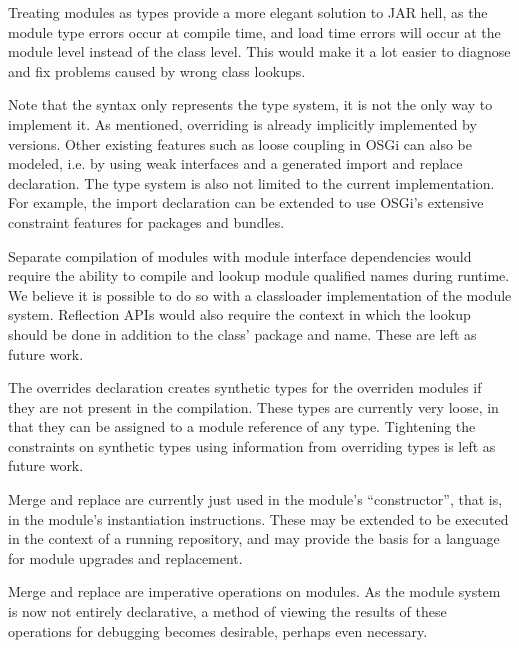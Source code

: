 Treating modules as types provide a more elegant solution to JAR hell, as the module
type errors occur at compile time, and load time errors will occur at the module level
instead of the class level. This would make it a lot easier to diagnose and
fix problems caused by wrong class lookups.

Note that the syntax only represents the type system, it is not the only way
to implement it. As mentioned, overriding is already implicitly implemented
by versions. Other existing features such as loose coupling in OSGi can
also be modeled, i.e. by using weak interfaces and a generated import and replace
declaration. The type system is also not limited to
the current implementation. For example, the import declaration can be 
extended to use OSGi's extensive constraint features for packages and bundles.

Separate compilation of modules with module interface dependencies would require
the ability to compile and lookup module qualified names during runtime. We believe
it is possible to do so with a classloader implementation of the module system. Reflection
APIs would also require the context in which the lookup should be done in addition to
the class' package and name. These are left as future work.

The overrides declaration creates synthetic types for the overriden modules 
if they are not present in the compilation. These types are currently very loose,
in that they can be assigned to a module reference of any type. Tightening the
constraints on synthetic types using information from overriding types is left
as future work.

Merge and replace are currently just used in the module's ``constructor'', that is, in
the module's instantiation instructions. These may be extended to be executed in the context
of a running repository, and may provide the basis for a language for module upgrades and replacement.

Merge and replace are imperative operations on modules. As the module system
is now not entirely declarative, a method of viewing the results of these operations
for debugging becomes desirable, perhaps even necessary.

